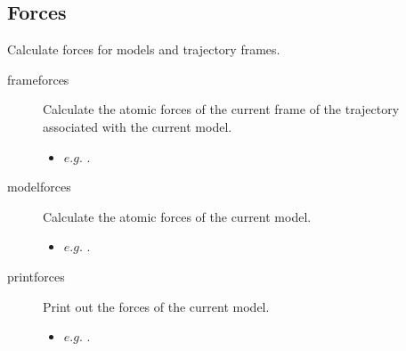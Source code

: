 \subsection{Forces}
Calculate forces for models and trajectory frames.\\
\begin{description}

	\item[frameforces\its] Calculate the atomic forces of the current frame of the trajectory associated with the current model.
	\begin{itemize}
		\item $e.g.$ .
	\end{itemize}

	\item[modelforces\its] Calculate the atomic forces of the current model.
	\begin{itemize}
		\item $e.g.$ .
	\end{itemize}

	\item[printforces\its] Print out the forces of the current model.
	\begin{itemize}
		\item $e.g.$ .
	\end{itemize}\text

\end{description}

